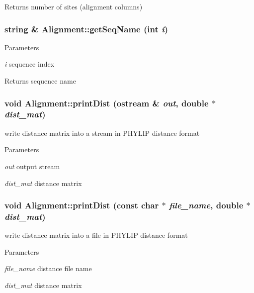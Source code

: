\label{classAlignment_a218c888333e7e7d35c44c3b554cf5716}
\begin{DoxyReturn}{Returns}
number of sites (alignment columns) 
\end{DoxyReturn}
\hypertarget{classAlignment_a88395c4218d679f68f7d8e74fb85ca9d}{
\subsubsection[{getSeqName}]{\setlength{\rightskip}{0pt plus 5cm}string \& Alignment::getSeqName (int {\em i})}}
\label{classAlignment_a88395c4218d679f68f7d8e74fb85ca9d}

\begin{DoxyParams}{Parameters}
\item[{\em i}]sequence index \end{DoxyParams}
\begin{DoxyReturn}{Returns}
sequence name 
\end{DoxyReturn}
\hypertarget{classAlignment_a2b951be4ee45b539683a0fd2692951fa}{
\subsubsection[{printDist}]{\setlength{\rightskip}{0pt plus 5cm}void Alignment::printDist (ostream \& {\em out}, \/  double $\ast$ {\em dist\_\-mat})}}
\label{classAlignment_a2b951be4ee45b539683a0fd2692951fa}
write distance matrix into a stream in PHYLIP distance format 
\begin{DoxyParams}{Parameters}
\item[{\em out}]output stream \item[{\em dist\_\-mat}]distance matrix \end{DoxyParams}
\hypertarget{classAlignment_ac99d17ec607ca7272c2d75686713865d}{
\subsubsection[{printDist}]{\setlength{\rightskip}{0pt plus 5cm}void Alignment::printDist (const char $\ast$ {\em file\_\-name}, \/  double $\ast$ {\em dist\_\-mat})}}
\label{classAlignment_ac99d17ec607ca7272c2d75686713865d}
write distance matrix into a file in PHYLIP distance format 
\begin{DoxyParams}{Parameters}
\item[{\em file\_\-name}]distance file name \item[{\em dist\_\-mat}]distance matrix \end{DoxyParams}
